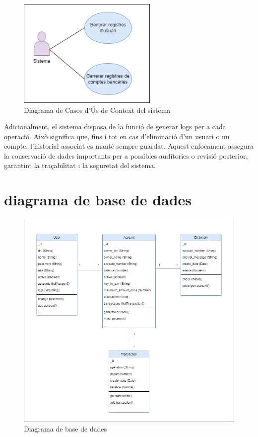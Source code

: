 \documentclass[a4paper,12pt,twoside]{ThesisStyle}
\begin{document}
\clearpage
\begin{figure}[h]
    \centering
    \includegraphics[width=0.6\textwidth]{imatges/logs.png}
    \caption{ Diagrama de Casos d'Ús de Context del sistema }
    \label{fig:Diagrama de Casos d'Ús de Context del sistema}
\end{figure}


Adicionalment, el sistema disposa de la funció de generar logs per a cada operació. Això significa que, fins i tot en cas d'eliminació d'un usuari o un compte, l'historial associat es manté sempre guardat. Aquest enfocament assegura la conservació de dades importants per a possibles auditories o revisió posterior, garantint la traçabilitat i la seguretat del sistema.

\clearpage
\section{diagrama de base de dades}
\label{sec: diagrama de base de dades}


\begin{figure}[h]
    \centering
    \includegraphics[width=1\textwidth]{imatges/diagrama base dades.png}
    \caption{ Diagrama de base de dades }
    \label{fig: Diagrama de base de dades}
\end{figure}
\end{document}
